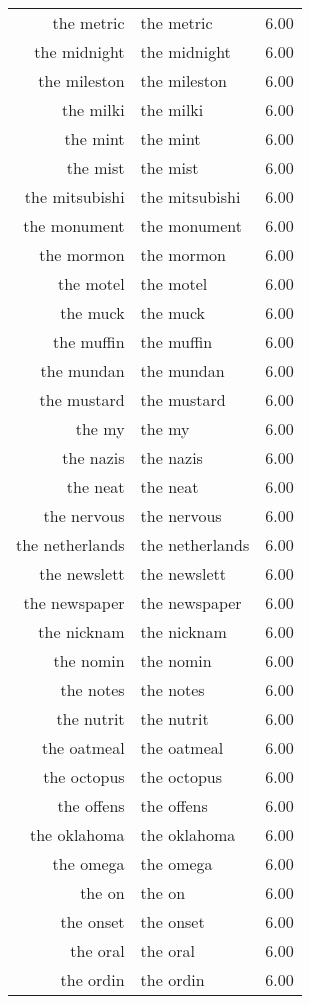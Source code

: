 \begin{table}[ht]
\begin{tabular}{rlr}
  the metric & the metric & 6.00 \\ 
  the midnight & the midnight & 6.00 \\ 
  the mileston & the mileston & 6.00 \\ 
  the milki & the milki & 6.00 \\ 
  the mint & the mint & 6.00 \\ 
  the mist & the mist & 6.00 \\ 
  the mitsubishi & the mitsubishi & 6.00 \\ 
  the monument & the monument & 6.00 \\ 
  the mormon & the mormon & 6.00 \\ 
  the motel & the motel & 6.00 \\ 
  the muck & the muck & 6.00 \\ 
  the muffin & the muffin & 6.00 \\ 
  the mundan & the mundan & 6.00 \\ 
  the mustard & the mustard & 6.00 \\ 
  the my & the my & 6.00 \\ 
  the nazis & the nazis & 6.00 \\ 
  the neat & the neat & 6.00 \\ 
  the nervous & the nervous & 6.00 \\ 
  the netherlands & the netherlands & 6.00 \\ 
  the newslett & the newslett & 6.00 \\ 
  the newspaper & the newspaper & 6.00 \\ 
  the nicknam & the nicknam & 6.00 \\ 
  the nomin & the nomin & 6.00 \\ 
  the notes & the notes & 6.00 \\ 
  the nutrit & the nutrit & 6.00 \\ 
  the oatmeal & the oatmeal & 6.00 \\ 
  the octopus & the octopus & 6.00 \\ 
  the offens & the offens & 6.00 \\ 
  the oklahoma & the oklahoma & 6.00 \\ 
  the omega & the omega & 6.00 \\ 
  the on & the on & 6.00 \\ 
  the onset & the onset & 6.00 \\ 
  the oral & the oral & 6.00 \\ 
  the ordin & the ordin & 6.00 \\ 

\end{tabular}
\end{table}
